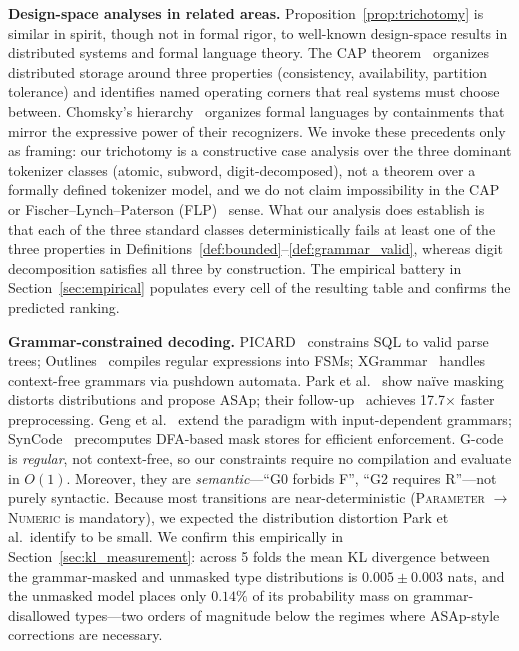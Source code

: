 \documentclass[sensors,article,submit,moreauthors,pdftex]{Definitions/mdpi}
\begin{document}
\textbf{Design-space analyses in related areas.}
Proposition~\ref{prop:trichotomy} is similar in spirit, though not in formal rigor, to well-known design-space results in distributed systems and formal language theory. The CAP theorem~\cite{cap_brewer,cap_gilbert_lynch} organizes distributed storage around three properties (consistency, availability, partition tolerance) and identifies named operating corners that real systems must choose between. Chomsky's hierarchy~\cite{chomsky_hierarchy} organizes formal languages by containments that mirror the expressive power of their recognizers. We invoke these precedents only as framing: our trichotomy is a constructive case analysis over the three dominant tokenizer classes (atomic, subword, digit-decomposed), not a theorem over a formally defined tokenizer model, and we do not claim impossibility in the CAP or Fischer--Lynch--Paterson (FLP)~\cite{flp} sense. What our analysis does establish is that each of the three standard classes deterministically fails at least one of the three properties in Definitions~\ref{def:bounded}--\ref{def:grammar_valid}, whereas digit decomposition satisfies all three by construction. The empirical battery in Section~\ref{sec:empirical} populates every cell of the resulting table and confirms the predicted ranking.

\textbf{Grammar-constrained decoding.}
PICARD~\cite{picard} constrains SQL to valid parse trees; Outlines~\cite{outlines} compiles regular expressions into FSMs; XGrammar~\cite{xgrammar} handles context-free grammars via pushdown automata. Park et al.~\cite{grammar_aligned} show na\"ive masking distorts distributions and propose ASAp; their follow-up~\cite{flexible_gcd} achieves 17.7$\times$ faster preprocessing. Geng et al.~\cite{gcd_input_dependent} extend the paradigm with input-dependent grammars; SynCode~\cite{syncode} precomputes DFA-based mask stores for efficient enforcement. G-code is \emph{regular}, not context-free, so our constraints require no compilation and evaluate in $O(1)$. Moreover, they are \emph{semantic}---``G0 forbids F'', ``G2 requires R''---not purely syntactic. Because most transitions are near-deterministic (\textsc{Parameter} $\to$ \textsc{Numeric} is mandatory), we expected the distribution distortion Park et al.\ identify to be small. We confirm this empirically in Section~\ref{sec:kl_measurement}: across 5 folds the mean KL divergence between the grammar-masked and unmasked type distributions is $0.005 \pm 0.003$ nats, and the unmasked model places only $0.14\%$ of its probability mass on grammar-disallowed types---two orders of magnitude below the regimes where ASAp-style corrections are necessary.
\end{document}
